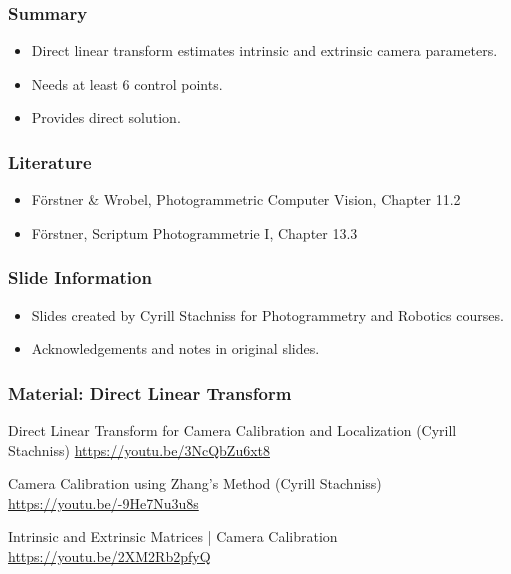 \begin{frame}
  \frametitle{Summary}
  \begin{itemize}
    \item Direct linear transform estimates intrinsic and extrinsic camera parameters.
    \item Needs at least 6 control points.
    \item Provides direct solution.
  \end{itemize}
\end{frame}

\begin{frame}
  \frametitle{Literature}
  \begin{itemize}
    \item Förstner \& Wrobel, Photogrammetric Computer Vision, Chapter 11.2
    \item Förstner, Scriptum Photogrammetrie I, Chapter 13.3
  \end{itemize}
\end{frame}

\begin{frame}
  \frametitle{Slide Information}
  \begin{itemize}
    \item Slides created by Cyrill Stachniss for Photogrammetry and Robotics courses.
    \item Acknowledgements and notes in original slides.
  \end{itemize}
\end{frame}

\begin{frame}
  \frametitle{Material: Direct Linear Transform}

  Direct Linear Transform for Camera Calibration and Localization (Cyrill Stachniss)
  \url{https://youtu.be/3NcQbZu6xt8}

  Camera Calibration using Zhang's Method (Cyrill Stachniss)
  \url{https://youtu.be/-9He7Nu3u8s}

  Intrinsic and Extrinsic Matrices | Camera Calibration
  \url{https://youtu.be/2XM2Rb2pfyQ}

\end{frame}
